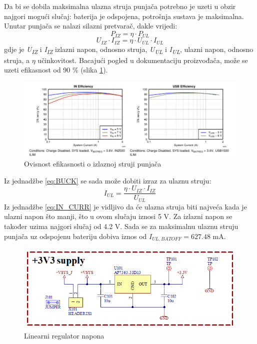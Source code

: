 Da bi se dobila maksimalna ulazna struja punjača potrebno je uzeti u obzir najgori mogući slučaj: baterija je odspojena, potrošnja sustava je maksimalna. Unutar punjača se nalazi silazni pretvarač, dakle vrijedi:
\begin{equation}
    P_{IZ}=\eta \cdot P_{UL}
\end{equation}
\begin{equation} \label{eq:BUCK}
    U_{IZ}\cdot I_{IZ}=\eta \cdot U_{UL} \cdot I_{UL}
\end{equation}
gdje je \textit{U\textsubscript{IZ}} i \textit{I\textsubscript{IZ}} izlazni napon, odnosno struja, \textit{U\textsubscript{UL}} i \textit{I\textsubscript{UL}}, ulazni napon, odnosno struja, a $\eta$ učinkovitost. Bacajući pogled u dokumentaciju proizvođača, može se uzeti efikasnost od 90 \% (slika \ref{slk:EFFICIENCY}).
\begin{figure}[H]
    \centering
    \includegraphics[width=\textwidth]{Figures/EFFICIENCY.PNG}
    \caption{Ovisnost efikasnosti o izlaznoj struji punjača \cite{ti:bq24166}}
    \label{slk:EFFICIENCY}
\end{figure}
\noindent Iz jednadžbe \ref{eq:BUCK} se sada može dobiti izraz za ulaznu struju:
\begin{equation} \label{eq:IN_CURR}
    I_{UL}=\frac{\eta \cdot U_{IZ} \cdot I_{IZ}}{U_{UL}}
\end{equation}
Iz jednadžbe \ref{eq:IN_CURR} je vidljivo da će ulazna struja biti najveća kada je ulazni napon što manji, što u ovom slučaju iznosi 5 V. Za izlazni napon se također uzima najgori slučaj od 4.2 V. Sada se za maksimalnu ulaznu struju punjača uz odspojenu bateriju dobiva iznos od ${I_{UL,BATOFF} = 627.48\textrm{ mA}}$.
\begin{figure}[H]
    \centering
    \includegraphics[width = 10 cm]{Figures/MB_LDO.png}
    \caption{Linearni regulator napona}
    \label{slk:MB_LDO}
\end{figure}

